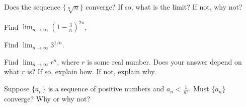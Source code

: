 \documentclass{exam}[12pt]
\begin{document}
\pagestyle{head}

\extraheadheight{.3in}
\extrafootheight{-.3in} 


\vspace{.2in}
\large{
\begin{questions}

\question Does the sequence $\{ \sqrt[n] n\}$ converge?  If so, what
is the limit?  If not, why not?
\vspace{3.5in}

\question Find $\displaystyle \lim_{n\to\infty} \left( 1 -\frac{3}{n}\right)^{2n}$.
\vspace{3.5in}

\question Find $\displaystyle \lim_{n\to\infty} 3^{1/n}$.
\vspace{1in}

\question Find $\displaystyle\lim_{n\to\infty} r^n$, where $r$ is some real number.
Does your answer depend on what $r$ is?  If so, explain how.  If not, 
explain why.

\vspace{4in}

\question Suppose $\{a_n\}$ is a sequence of positive numbers and $a_n <
\frac{1}{n^2}$.  Must $\{a_n\}$ converge?  Why or why not?




\end{questions}

}
\end{document}
